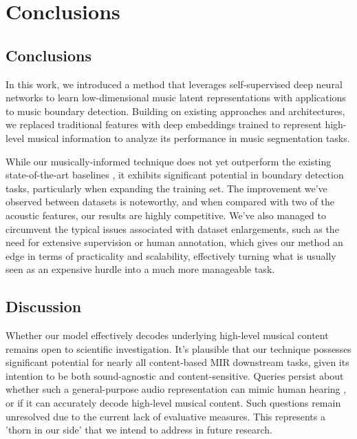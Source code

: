 \chapter{Conclusions}

\section{Conclusions}

In this work, we introduced a method that leverages self-supervised deep neural networks to learn low-dimensional music latent representations with applications to music boundary detection. Building on existing approaches and architectures, we replaced traditional features with deep embeddings trained to represent high-level musical information to analyze its performance in music segmentation tasks.

While our musically-informed technique does not yet outperform the existing state-of-the-art baselines \cite{deepfeaturesegment, SalamonDeepSegmentation}, it exhibits significant potential in boundary detection tasks, particularly when expanding the training set. The improvement we've observed between datasets is noteworthy, and when compared with two of the acoustic features, our results are highly competitive. We've also managed to circumvent the typical issues associated with dataset enlargements, such as the need for extensive supervision or human annotation, which gives our method an edge in terms of practicality and scalability, effectively turning what is usually seen as an expensive hurdle into a much more manageable task.

\section{Discussion}

Whether our model effectively decodes underlying high-level musical content remains open to scientific investigation. It's plausible that our technique possesses significant potential for nearly all content-based MIR downstream tasks, given its intention to be both sound-agnostic and content-sensitive. Queries persist about whether such a general-purpose audio representation can mimic human hearing \cite{Li2023MERT:Training, Turian2022HEAR:Representations}, or if it can accurately decode high-level musical content. Such questions remain unresolved due to the current lack of evaluative measures. This represents a 'thorn in our side' that we intend to address in future research.


